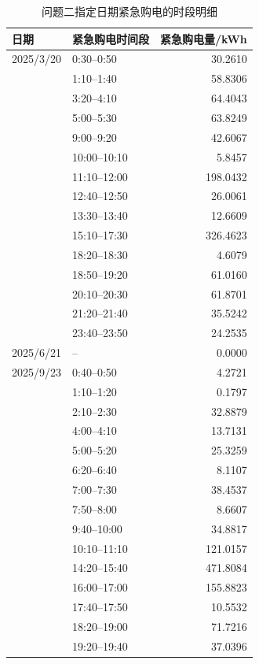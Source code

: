 \begin{table}[H]
  \centering
  \caption{问题二指定日期紧急购电的时段明细}
  \label{tab:q2-emergency-full}
  \begin{tabular}{llr}
    \toprule
    日期 & 紧急购电时间段 & 紧急购电量/kWh \\
    \midrule
    2025/3/20 & 0:30--0:50 & 30.2610 \\
     & 1:10--1:40 & 58.8306 \\
     & 3:20--4:10 & 64.4043 \\
     & 5:00--5:30 & 63.8249 \\
     & 9:00--9:20 & 42.6067 \\
     & 10:00--10:10 & 5.8457 \\
     & 11:10--12:00 & 198.0432 \\
     & 12:40--12:50 & 26.0061 \\
     & 13:30--13:40 & 12.6609 \\
     & 15:10--17:30 & 326.4623 \\
     & 18:20--18:30 & 4.6079 \\
     & 18:50--19:20 & 61.0160 \\
     & 20:10--20:30 & 61.8701 \\
     & 21:20--21:40 & 35.5242 \\
     & 23:40--23:50 & 24.2535 \\
    2025/6/21 & -- & 0.0000 \\
    2025/9/23 & 0:40--0:50 & 4.2721 \\
     & 1:10--1:20 & 0.1797 \\
     & 2:10--2:30 & 32.8879 \\
     & 4:00--4:10 & 13.7131 \\
     & 5:00--5:20 & 25.3259 \\
     & 6:20--6:40 & 8.1107 \\
     & 7:00--7:30 & 38.4537 \\
     & 7:50--8:00 & 8.6607 \\
     & 9:40--10:00 & 34.8817 \\
     & 10:10--11:10 & 121.0157 \\
     & 14:20--15:40 & 471.8084 \\
     & 16:00--17:00 & 155.8823 \\
     & 17:40--17:50 & 10.5532 \\
     & 18:20--19:00 & 71.7216 \\
     & 19:20--19:40 & 37.0396 \\

\end{tabular}
\end{table}
